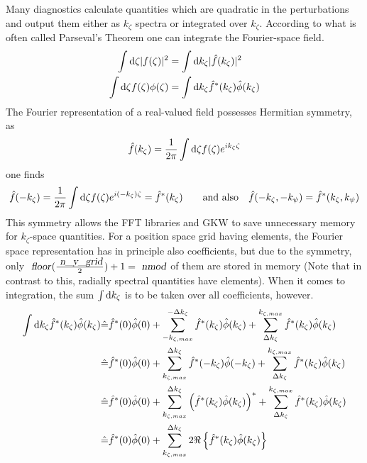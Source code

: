 Many diagnostics calculate quantities which are quadratic in the
perturbations and output them either as $k_\zeta$ spectra or
integrated over $k_\zeta$.  According to what is often called
Parseval's Theorem one can integrate the Fourier-space field.
\begin{align}
  \int \mathrm{d}\zeta |f(\zeta)|^2 &= \int \mathrm{d} k_\zeta |\hat f(k_\zeta)|^2 \nonumber\\
  \int \mathrm{d}\zeta f(\zeta)\phi(\zeta) &= \int \mathrm{d} k_\zeta \hat f^*(k_\zeta) \hat\phi(k_\zeta)
\end{align}
The Fourier representation of a real-valued field possesses Hermitian symmetry, as
\begin{align}
  \hat f(k_\zeta) = \frac{1}{2\pi} \int\mathrm{d}\zeta f(\zeta) e^{i k_\zeta \zeta}
\end{align}
one finds
\begin{align}
  \hat f(-k_\zeta) = \frac{1}{2\pi} \int\mathrm{d}\zeta f(\zeta) e^{i (-k_\zeta) \zeta} = \hat f^*(k_\zeta) \qquad\text{and also}\quad \hat f(-k_\zeta, -k_\psi) = \hat f^*(k_\zeta, k_\psi)
\end{align}
This symmetry allows the FFT libraries and GKW to save unnecessary
memory for $k_\zeta$-space quantities. For a position space grid
having  elements, the Fourier space representation
has in principle also  coefficients, but due to the
symmetry, only
$\name{floor}(\frac{\name{n\_y\_grid}}{2}) + 1 = \name{nmod}$ of them
are stored in memory (Note that in contrast to this, radially spectral
quantities have  elements).  When it comes to
integration, the sum $\int\mathrm{d} k_\zeta$ is to be taken over all
 coefficients, however.
\begin{align}
  \int \mathrm{d} k_\zeta \hat f^*(k_\zeta) \hat\phi(k_\zeta) &\hat{=} 
\hat f^*(0) \hat\phi(0) + 
\sum_{-k_{\zeta,max}}^{-\Delta k_\zeta}\hat f^*(k_\zeta) \hat\phi(k_\zeta) + 
\sum_{\Delta k_\zeta}^{k_{\zeta,max}}\hat f^*(k_\zeta) \hat\phi(k_\zeta)  \nonumber\\
&\hat{=} 
\hat f^*(0) \hat\phi(0) + 
\sum_{k_{\zeta,max}}^{\Delta k_\zeta}\hat f^*(-k_\zeta) \hat\phi(-k_\zeta) + 
\sum_{\Delta k_\zeta}^{k_{\zeta,max}}\hat f^*(k_\zeta) \hat\phi(k_\zeta)  \nonumber\\
&\hat{=} 
\hat f^*(0) \hat\phi(0) + 
\sum_{k_{\zeta,max}}^{\Delta k_\zeta}\left(\hat f^*(k_\zeta) \hat\phi(k_\zeta)\right)^* + 
\sum_{\Delta k_\zeta}^{k_{\zeta,max}}\hat f^*(k_\zeta) \hat\phi(k_\zeta)  \nonumber\\
&\hat{=} 
\hat f^*(0) \hat\phi(0) + 
\sum_{k_{\zeta,max}}^{\Delta k_\zeta} 2 \Re\left\{\hat f^*(k_\zeta) \hat\phi(k_\zeta)\right\} 
\end{align}
